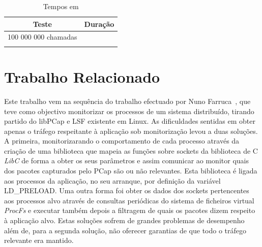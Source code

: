 \documentclass[a4paper]{llncs}
\begin{document}
\begin{table}
\begin{center}

\begin{tabular}{ | c | c |  }
\hline
Teste & \hspace{1cm}Duração\hspace{1cm} \\
\hline
100 000 000 chamadas & \\
\hline
 & \\
\hline

\hline
\end{tabular}
\caption{Tempos em }
\label{tab:kprobes_info}
\end{center}
\end{table}


\section{Trabalho Relacionado}
\label{sec:related_work}


Este trabalho vem na sequência do trabalho efectuado por Nuno Farruca~\cite{Farruca:2009,duarte10}, que teve como objectivo monitorizar os processos de um sistema distribuído, tirando partido do libPCap e LSF existente em Linux. As dificuldades sentidas em obter apenas o tráfego respeitante à aplicação sob monitorização levou a duas soluções. A primeira, monitorizarando o comportamento de cada processo através da criação de uma biblioteca que mapeia as funções sobre sockets da biblioteca de C \textit{LibC} de forma a obter os seus parâmetros e assim comunicar ao monitor quais dos pacotes capturados pelo PCap são ou não relevantes. Esta biblioteca é ligada aos processos da aplicação, no seu arranque, por definição da variável LD\_PRELOAD.
 Uma outra forma foi obter os dados dos sockets pertencentes aos processos alvo através de consultas periódicas do sistema de ficheiros virtual \textit{ProcFs} e executar também depois a filtragem de quais os pacotes dizem respeito à aplicação alvo.  Estas soluções sofrem de grandes problemas de desempenho além de, para a segunda solução, não oferecer garantias de que todo o tráfego relevante era mantido.
\end{document}
